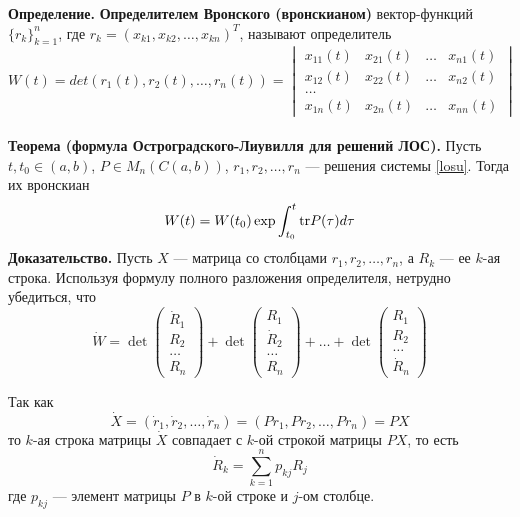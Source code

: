 \noindent \textbf{Определение.} \textbf{Определителем Вронского (вронскианом)} вектор-функций $\{r_k\}_{k=1}^n$, где $r_k=(x_{k1}, x_{k2}, \ldots, x_{kn})^T$, называют определитель
\begin{equation*}
    W(t) = det(r_1(t),r_2(t),\ldots, r_n(t)) = \begin{vmatrix}
        x_{11}(t) & x_{21}(t) & \ldots & x_{n1}(t) \\
        x_{12}(t) & x_{22}(t) & \ldots & x_{n2}(t) \\
        \ldots                                     \\
        x_{1n}(t) & x_{2n}(t) & \ldots & x_{nn}(t)
    \end{vmatrix}
\end{equation*}
\\
\noindent \textbf{Теорема (формула Остроградского-Лиувилля для решений ЛОС).} Пусть $t, t_0 \in (a,b)$, $P \in M_n(C(a,b))$, $r_1, r_2, \ldots, r_n$ --- решения системы \eqref{losu}. Тогда их вронскиан
\begin{equation*}
    W(t) = W(t_0)\exp \int_{t_0}^t \text{tr} P(\tau)d\tau
\end{equation*}
\textbf{Доказательство.} Пусть $X$ --- матрица со столбцами $r_1, r_2, \ldots, r_n$, а $R_k$ --- ее $k$-ая строка. Используя формулу полного разложения определителя, нетрудно убедиться, что
\begin{equation*}
    \dot{W} = \det\begin{pmatrix}
        \dot{R}_1 \\
        R_2       \\
        \ldots    \\
        R_n
    \end{pmatrix} + \det\begin{pmatrix}
        R_1       \\
        \dot{R}_2 \\
        \ldots    \\
        R_n
    \end{pmatrix} + \ldots + \det\begin{pmatrix}
        R_1    \\
        R_2    \\
        \ldots \\
        \dot{R}_n
    \end{pmatrix}
\end{equation*}

Так как
\begin{equation*}
    \dot{X} = (\dot{r}_1, \dot{r}_2, \ldots, \dot{r}_n) = (Pr_1, Pr_2, \ldots, Pr_n) = PX
\end{equation*}
то $k$-ая строка матрицы $\dot{X}$ совпадает с $k$-ой строкой матрицы $PX$, то есть
\begin{equation*}
    \dot{R}_k = \sum_{k=1}^n p_{kj}R_j
\end{equation*}
где $p_{kj}$ --- элемент матрицы $P$ в $k$-ой строке и $j$-ом столбце.

